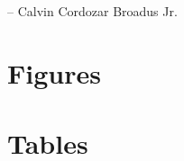 \documentclass[12pt,oneside,a4paper]{report}
\begin{document}
		-- Calvin Cordozar Broadus Jr.
		
	
	
	\chapter*{}
	\tableofcontents
	\listoffigures
	\listoftables
	
	\pagebreak
	
	
	
		
	
	
	
	
	
	
	\printbibliography %
	
	
	
	\begin{appendices}
	
		\chapter{Figures}
			
			
		\chapter{Tables}
			
	\end{appendices}
	
	
	
	
	
	
\end{document}
